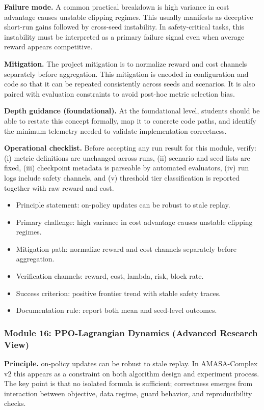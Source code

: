 \documentclass[conference]{IEEEtran}
\begin{document}
\textbf{Failure mode.} A common practical breakdown is high variance in cost advantage causes unstable clipping regimes. This usually manifests as deceptive short-run gains followed by cross-seed instability. In safety-critical tasks, this instability must be interpreted as a primary failure signal even when average reward appears competitive.

\textbf{Mitigation.} The project mitigation is to normalize reward and cost channels separately before aggregation. This mitigation is encoded in configuration and code so that it can be repeated consistently across seeds and scenarios. It is also paired with evaluation constraints to avoid post-hoc metric selection bias.

\textbf{Depth guidance (foundational).} At the foundational level, students should be able to restate this concept formally, map it to concrete code paths, and identify the minimum telemetry needed to validate implementation correctness.

\textbf{Operational checklist.} Before accepting any run result for this module, verify: (i) metric definitions are unchanged across runs, (ii) scenario and seed lists are fixed, (iii) checkpoint metadata is parseable by automated evaluators, (iv) run logs include safety channels, and (v) threshold tier classification is reported together with raw reward and cost.

\begin{itemize}[leftmargin=*]
  \item Principle statement: on-policy updates can be robust to stale replay.
  \item Primary challenge: high variance in cost advantage causes unstable clipping regimes.
  \item Mitigation path: normalize reward and cost channels separately before aggregation.
  \item Verification channels: reward, cost, lambda, risk, block rate.
  \item Success criterion: positive frontier trend with stable safety traces.
  \item Documentation rule: report both mean and seed-level outcomes.
\end{itemize}


\subsubsection{Module 16: PPO-Lagrangian Dynamics (Advanced Research View)}
\textbf{Principle.} on-policy updates can be robust to stale replay. In AMASA-Complex v2 this appears as a constraint on both algorithm design and experiment process. The key point is that no isolated formula is sufficient; correctness emerges from interaction between objective, data regime, guard behavior, and reproducibility checks.
\end{document}
